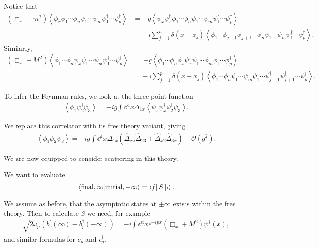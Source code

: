 Notice that
\begin{align}
    \left( \Box_x + m^2 \right) \left<\phi_x \phi_1 \cdots \phi_n \psi_1 \cdots \psi_m \psi_1^{\dag} \cdots \psi_p^{\dag} \right> &= -g \left< \psi_x \psi_x^{\dag} \phi_1 \cdots \phi_n \psi_1 \cdots \psi_m \psi_1^{\dag} \cdots \psi_p^{\dag} \right> \nonumber \\
                                                                                                                                &\quad - i \sum_{j=1}^{n}  \delta \left( x- x_{j} \right) \left<\phi_1 \cdots \phi_{j-1} \phi_{j+1} \cdots \phi_n \psi_1 \cdots \psi_m \psi_1^{\dag} \cdots \psi_p^{\dag} \right> 
.\end{align}
Similarly,
\begin{align}
    \left( \Box_x + M^2 \right) \left< \phi_1 \cdots \phi_n \psi_x \psi_1 \cdots \psi_m \psi_1^{\dag} \cdots \psi_p^{\dag} \right> &= -g \left< \phi_1 \cdots \phi_n \phi_x \psi_x^{\dag} \psi_1 \cdots \phi_m \phi_1^{\dag} \cdots \phi_p^{\dag} \right> \nonumber \\
    &\quad - i \sum_{j=1}^{p}  \delta \left( x- x_{j} \right) \left<\phi_1 \cdots \phi_n \psi_1 \cdots \psi_m \psi_1^{\dag} \cdots \psi^{\dag}_{j-1} \psi^{\dag}_{j+1} \cdots\psi_p^{\dag} \right> 
.\end{align}

To infer the Feynman rules, we look at the three point function
\begin{align}
    \left<\phi_1 \psi_2^{\dag} \psi_3 \right> = -ig \int \dd{^{4}x} \Delta_{1x} \left<\psi_x \psi^{\dag}_x \psi_2^{\dag} \psi_3 \right> 
.\end{align}

We replace this correlator with its free theory variant, giving
\begin{align}
    \left<\phi_1 \psi_2^{\dag} \psi_3 \right> = -ig \int \dd{^{4}x} \Delta_{1 x} \left( \hat{\Delta}_{x x} \hat{\Delta}_{23} + \hat{\Delta}_{x 2} \hat{\Delta}_{3 x} \right) + \mathcal{O}\left( g^2 \right)  
.\end{align}


We are now equipped to consider scattering in this theory.

We want to evaluate
\begin{align}
    \bra{\text{final}, \infty} \ket{\text{initial}, -\infty} = \bra{f} S \ket{i}
.\end{align}

We assume as before, that the asymptotic states at $\pm \infty$ exists within the free theory. Then to calculate $S$ we need, for example,
\begin{align}
    \sqrt{2 \widetilde{\omega}_p}  \left( b^{\dag}_p \left( \infty \right)  - b^{\dag}_p \left( - \infty \right)  \right) = - i \int \dd{^{4}x} e^{-ipx} \left( \Box_x + M^2 \right) \psi^{\dag} \left( x \right) 
,\end{align}
and similar formulas for $c_p$ and $c^{\dag}_p$.

